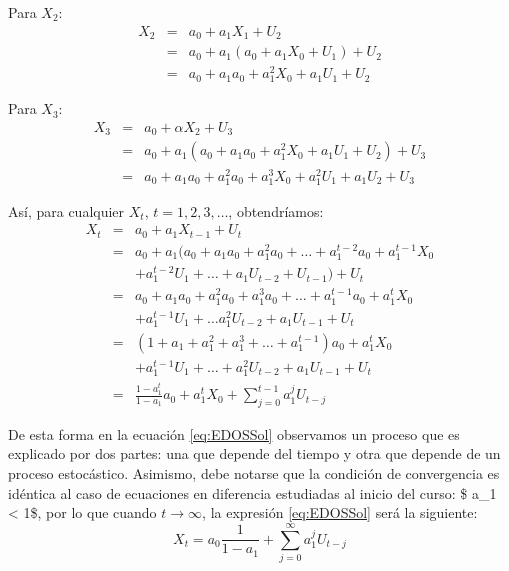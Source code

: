 \documentclass[
]{book}
\begin{document}
Para \(X_2\):
\begin{eqnarray*}
    X_{2} & = & a_0 + a_1 X_{1} + U_{2} \\
    & = & a_0 + a_1 (a_0 + a_1 X_{0} + U_{1}) + U_{2} \\
    & = & a_0 + a_1 a_0 + a_1^2 X_{0} + a_1 U_{1} + U_{2}
\end{eqnarray*}

Para \(X_3\):
\begin{eqnarray*}
    X_{3} & = & a_0 + \alpha X_{2} + U_{3} \\
    & = & a_0 + a_1 (a_0 + a_1 a_0 + a_1^2 X_{0} + a_1 U_{1} + U_{2}) + U_{3} \\
    & = & a_0 + a_1 a_0 + a_1^2 a_0 + a_1^3 X_{0} + a_1^2 U_{1} + a_1 U_{2} + U_{3}
\end{eqnarray*}

Así, para cualquier \(X_t\), \(t = 1, 2, 3, \ldots\), obtendríamos:
\begin{eqnarray}
    X_{t} & = & a_0 + a_1 X_{t - 1} + U_{t} \nonumber \\
    & = & a_0 + a_1 (a_0 + a_1 a_0 + a_1^2 a_0 + \ldots + a_1^{t-2} a_0 + a_1^{t-1} X_{0} \nonumber \\
    &   & + a_1^{t-2} U_{1} + \ldots + a_1 U_{t - 2} + U_{t - 1}) + U_{t} \nonumber \\
    & = & a_0 + a_1 a_0 + a_1^2 a_0 + a_1^3 a_0 + \ldots + a_1^{t-1} a_0 + a_1^{t} X_{0} \nonumber \\
    &   & + a_1^{t-1} U_{1} + \ldots a_1^2 U_{t - 2} + a_1 U_{t - 1} + U_{t} \nonumber \\
    & = & (1 + a_1 + a_1^2 + a_1^3 + \ldots + a_1^{t-1}) a_0 + a_1^{t} X_{0} \nonumber \\
    &   & + a_1^{t-1} U_{1} + \ldots + a_1^2 U_{t - 2} + a_1 U_{t - 1} + U_{t}  \nonumber\\
    & = & \frac{1 - a_1^t}{1 - a_1} a_0 + a_1^{t} X_{0} + \sum^{t-1}_{j = 0} a_1^{j} U_{t - j} 
    \label{eq:EDOSSol}
\end{eqnarray}

De esta forma en la ecuación \eqref{eq:EDOSSol} observamos un proceso que es explicado por dos partes: una que depende del tiempo y otra que depende de un proceso estocástico. Asimismo, debe notarse que la condición de convergencia es idéntica al caso de ecuaciones en diferencia estudiadas al inicio del curso: \$ \textbar a\_1\textbar{} \textless{} 1\$, por lo que cuando \(t \to \infty\), la expresión \eqref{eq:EDOSSol} será la siguiente:
\begin{equation}
    X_t = a_0 \frac{1}{1 - a_1} + \sum^{\infty}_{j = 0} a_1^{j} U_{t - j}
    \label{eq:EDOSLP}
\end{equation}
\end{document}
